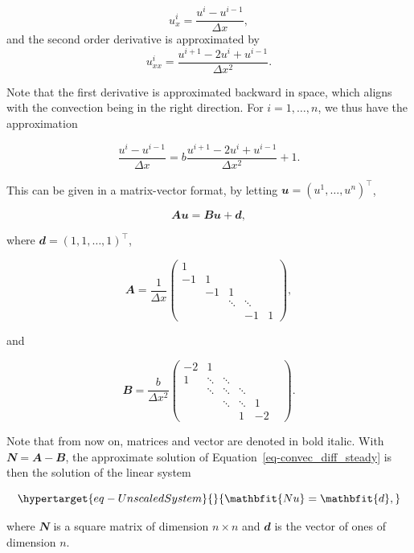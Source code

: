 \documentclass[
  letterpaper,
]{report}
\theoremstyle{plain}
\theoremstyle{definition}
\theoremstyle{definition}
\theoremstyle{remark}
\begin{document}
\[
    u_x^i = \frac{u^i - u^{i-1}}{\Delta x},
\] and the second order derivative is approximated by \[
    u^i_{xx} = \frac{u^{i+1} - 2u^i + u^{i-1}}{\Delta x ^2}.
\]

Note that the first derivative is approximated backward in space, which
aligns with the convection being in the right direction. For
\(i = 1 , \dots , n\), we thus have the approximation

\[
\frac{u^i - u^{i-1}}{\Delta x}  = b \frac{u^{i+1} - 2u^i + u^{i-1}}{\Delta x ^2} + 1.
\]

\vspace{3cm}

This can be given in a matrix-vector format, by letting
\(\mathbfit{u} = (u^1,\dots, u^{n})^\intercal\),

\[
    \mathbfit{Au} = \mathbfit{Bu}+\mathbfit{d},
\]

where \(\mathbfit{d} = (1,1,\dots , 1)^\intercal\),

\[
\mathbfit{A} = \frac{1}{\Delta x}\begin{pmatrix}
    1 &  &&&\\
    -1 & 1 &&\\
    & -1 & 1 &\\
    &&\ddots & \ddots &\\
    &&&-1& 1 
\end{pmatrix}, 
\]

and

\[
\mathbfit{B} =  \frac{b}{\Delta x ^2}\begin{pmatrix}
    -2 & 1 &&&\\
    1 & \ddots & \ddots &&\\
    & \ddots & \ddots & \ddots&\\
    && \ddots & \ddots & 1 &\\
    &&&1 & -2  
\end{pmatrix} .
\]

Note that from now on, matrices and vector are denoted in bold italic.
With \(\mathbfit{N} = \mathbfit{A}-\mathbfit{B}\), the approximate
solution of Equation~\ref{eq-convec_diff_steady} is then the solution of
the linear system

\begin{equation}\protect\hypertarget{eq-UnscaledSystem}{}{
\mathbfit{Nu} = \mathbfit{d},
}\label{eq-UnscaledSystem}\end{equation}

where \(\mathbfit{N}\) is a square matrix of dimension \(n \times n\)
and \(\mathbfit{d}\) is the vector of ones of dimension \(n\).
\end{document}
